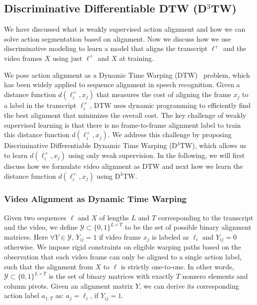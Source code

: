 \documentclass[10pt,twocolumn,letterpaper]{article}
\newcommand{\dttw}{D${}^3$TW\xspace}
\begin{document}
\subsection{Discriminative Differentiable DTW (\dttw)}

We have discussed what is weakly supervised action alignment and how we can solve action segmentation based on alignment. Now we discuss how we use discriminative modeling to learn a model that aligns the transcript $\ell^+$ and the video frames $X$ using just $\ell^+$ and $X$ at training.

We pose action alignment as a Dynamic Time Warping  (DTW)~\cite{sakoe1978dynamic} problem, which has been widely applied to sequence alignment in speech recognition. Given a distance function $d(\ell^+_i, x_j)$ that measures the cost of aligning the frame $x_j$ to a label in the transcript $\ell^+_i$, DTW uses dynamic programming to efficiently find the best alignment that minimizes the overall cost. The key challenge of weakly supervised learning is that there is no frame-to-frame alignment label to train this distance function $d(\ell^+_i, x_j)$. We address this challenge by proposing Discriminative Differentiable Dynamic Time Warping (\dttw), which allows us to learn $d(\ell^+_i, x_j)$ using only weak supervision. In the following, we will first discuss how we formulate video alignment as DTW and next how we learn the distance function $d(\ell^+_i, x_j)$ using \dttw. 

\subsubsection{Video Alignment as Dynamic Time Warping}
\label{sec:vid_align}

Given two sequences $\ell$ and $X$ of lengths $L$ and $T$ corresponding to the transcript and the video, we define $\mathcal{Y} \subset \{0,1\}^{L\times T}$ to be the set of possible binary alignment matrices. Here $\forall Y \in \mathcal{Y}$, $Y_{ij} = 1$ if video frame $x_j$ is labeled as $\ell_i$ and $Y_{ij} = 0$ otherwise. We impose rigid constraints on eligible warping paths based on the observation that each video frame can only be aligned to a single action label, such that the alignment from $X$ to $\ell$ is strictly one-to-one. In other words, $\mathcal{Y} \subset \{0,1\}^{L\times T}$ is the set of binary matrices with exactly $T$ nonzero elements and column pivots. Given an alignment matrix $Y$, we can derive its corresponding action label $a_{1:T}$ as: $a_j = \ell_i$, if $Y_{ij} = 1$.
\end{document}
